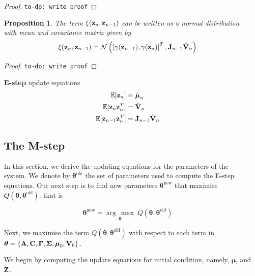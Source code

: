 \documentclass[11pt]{article}
\newcommand{\argmax}[1]{\underset{#1}{\operatorname{arg}\,\operatorname{max}}\;}
\newtheorem{proposition}{Proposition}[section]
\begin{document}
\begin{proof}
	\texttt{to-do: write proof}
\end{proof}

\begin{proposition}
	The term $\xi({\bf z}_n, {\bf z}_{n-1})$ can be written as a normal distribution with mean and covariance matrix given by
	\begin{equation}
		\xi({\bf z}_n, {\bf z}_{n-1}) = \mathcal{N}\left(\left[\gamma({\bf z}_{n-1}), \gamma({\bf z}_{n})\right]^T, {\bf J}_{n-1}\hat{\bf V}_{n}\right)
	\end{equation}
\end{proposition}

\begin{proof}
	\texttt{to-do: write proof}
\end{proof}

\begin{tcolorbox}
\textbf{E-step} update equations
\begin{align}
	\mathbb{E}[{\bf z}_n] &= \hat{\boldsymbol{\mu}}_n\\
	\mathbb{E}[{\bf z}_n {\bf z}_n^T] &= \hat{{\bf V}}_n\\
	\mathbb{E}[{\bf z}_{n-1}{\bf z}_n^T] &= {\bf J}_{n-1}\hat{\bf V}_n
\end{align}
\end{tcolorbox}


\subsection{The M-step}
In this section, we derive the updating equations for the parameters of the system. We denote by $\boldsymbol{\theta}^\text{old}$ the set of parameters used to compute the E-step equations. Our next step is to find new parameters $\boldsymbol{\theta}^\text{new}$ that maximise $Q(\boldsymbol\theta, \boldsymbol\theta^\text{old})$, that is

\begin{equation}
	\boldsymbol{\theta}^\text{new} = \argmax{\boldsymbol\theta} Q(\boldsymbol\theta, \boldsymbol\theta^\text{old})
\end{equation}

Next, we maximise the term $Q(\boldsymbol\theta, \boldsymbol\theta^\text{old})$ with respect to each term in $\boldsymbol\theta = \{{\bf A}, {\bf C}, \boldsymbol\Gamma, \boldsymbol\Sigma, \boldsymbol\mu_0, {\bf V}_0\}$.

We begin by computing the update equations for initial condition, namely, $\boldsymbol\mu$, and $\bf Z$. 
\end{document}
